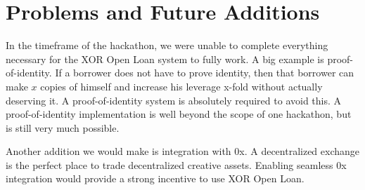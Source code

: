 \documentclass[twoside]{article}
\begin{document}
\section{Problems and Future Additions}
In the timeframe of the hackathon, we were unable to complete everything necessary for the XOR Open Loan system to fully work. A big example is proof-of-identity. If a borrower does not have to prove identity, then that borrower can make $x$ copies of himself and increase his leverage x-fold without actually deserving it. A proof-of-identity system is absolutely required to avoid this. A proof-of-identity implementation is well beyond the scope of one hackathon, but is still very much possible. 

Another addition we would make is integration with 0x. A decentralized exchange is the perfect place to trade decentralized creative assets. Enabling seamless 0x integration would provide a strong incentive to use XOR Open Loan. 
\end{document}
